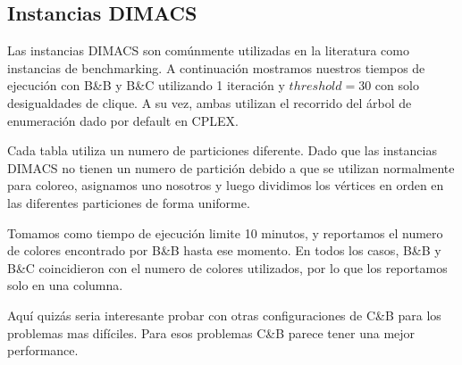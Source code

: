 \subsection{Instancias DIMACS}

Las instancias DIMACS son comúnmente utilizadas en la literatura como instancias de benchmarking. A continuación mostramos nuestros tiempos de ejecución con B\&B y B\&C utilizando 1 iteración y $threshold = 30$ con solo desigualdades de clique. A su vez, ambas utilizan el recorrido del árbol de enumeración dado por default en CPLEX.

Cada tabla utiliza un numero de particiones diferente. Dado que las instancias DIMACS no tienen un numero de partición debido a que se utilizan normalmente para coloreo, asignamos uno nosotros y luego dividimos los vértices en orden en las diferentes particiones de forma uniforme.

Tomamos como tiempo de ejecución limite 10 minutos, y reportamos el numero de colores encontrado por B\&B hasta ese momento. En todos los casos, B\&B y B\&C coincidieron con el numero de colores utilizados, por lo que los reportamos solo en una columna.

Aquí quizás seria interesante probar con otras configuraciones de C\&B para los problemas mas difíciles. Para esos problemas C\&B parece tener una mejor performance.

